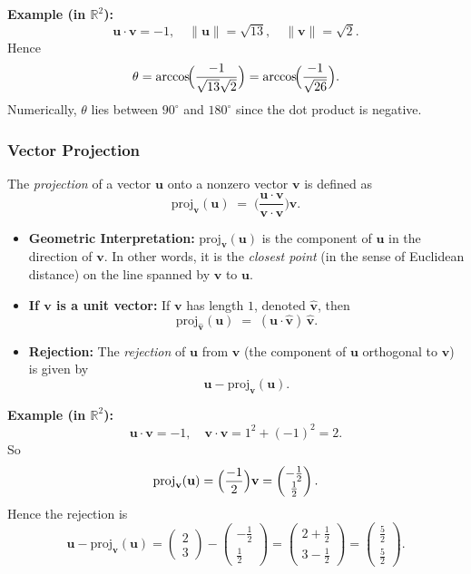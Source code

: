 \noindent
\textbf{Example (in $\mathbb{R}^2$):}
\[
\mathbf{u} \cdot \mathbf{v} = -1,
\quad
\|\mathbf{u}\| = \sqrt{13},
\quad
\|\mathbf{v}\| = \sqrt{2}.
\]
Hence
\[
\theta 
= \arccos\!\Bigl(\frac{-1}{\sqrt{13} \sqrt{2}}\Bigr)
= \arccos\!\Bigl(\frac{-1}{\sqrt{26}}\Bigr).
\]
Numerically, $\theta$ lies between $90^\circ$ and $180^\circ$ since the dot product is negative.

\subsubsection{Vector Projection}
The \emph{projection} of a vector $\mathbf{u}$ onto a nonzero vector $\mathbf{v}$ is 
defined as
\[
\text{proj}_{\mathbf{v}}(\mathbf{u}) \;=\; 
\biggl(\frac{\mathbf{u} \cdot \mathbf{v}}{\mathbf{v} \cdot \mathbf{v}}\biggr)\mathbf{v}.
\]
\begin{itemize}
\item \textbf{Geometric Interpretation:} 
      $\text{proj}_{\mathbf{v}}(\mathbf{u})$ is the component of $\mathbf{u}$ 
      in the direction of $\mathbf{v}$. In other words, it is the \emph{closest point} 
      (in the sense of Euclidean distance) on the line spanned by $\mathbf{v}$ to $\mathbf{u}$.
\item \textbf{If \(\mathbf{v}\) is a unit vector:} 
      If $\mathbf{v}$ has length $1$, denoted $\widehat{\mathbf{v}}$, then
      \[
         \text{proj}_{\widehat{\mathbf{v}}}(\mathbf{u}) 
         \;=\; (\mathbf{u} \cdot \widehat{\mathbf{v}})\,\widehat{\mathbf{v}}.
      \]
\item \textbf{Rejection:}
      The \emph{rejection} of $\mathbf{u}$ from $\mathbf{v}$ (the component of $\mathbf{u}$ 
      orthogonal to $\mathbf{v}$) is given by 
      \[
         \mathbf{u} - \text{proj}_{\mathbf{v}}(\mathbf{u}).
      \]
\end{itemize}

\noindent
\textbf{Example (in $\mathbb{R}^2$):}
\[
\mathbf{u} \cdot \mathbf{v} 
= -1, 
\quad
\mathbf{v} \cdot \mathbf{v} 
= 1^2 + (-1)^2 
= 2.
\]
So
\[
\text{proj}_{\mathbf{v}}(\mathbf{u}) 
= \Bigl(\frac{-1}{2}\Bigr) \mathbf{v}
= \begin{pmatrix} -\tfrac{1}{2} \\ \tfrac{1}{2} \end{pmatrix}.
\]
Hence the rejection is
\[
\mathbf{u} - \text{proj}_{\mathbf{v}}(\mathbf{u})
= \begin{pmatrix} 2 \\ 3 \end{pmatrix} 
  - 
  \begin{pmatrix} -\tfrac{1}{2} \\ \tfrac{1}{2} \end{pmatrix}
= \begin{pmatrix} 2 + \tfrac{1}{2} \\ 3 - \tfrac{1}{2} \end{pmatrix}
= \begin{pmatrix} \tfrac{5}{2} \\ \tfrac{5}{2} \end{pmatrix}.
\]


